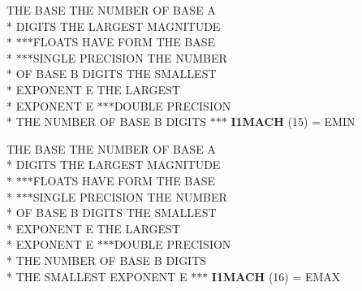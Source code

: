 \begin{DoxyCompactItemize}
\item 
\hypertarget{namespaceport_a3c34e8db5d9e994247f6ee958abcc155}{T\+H\+E B\+A\+S\+E T\+H\+E N\+U\+M\+B\+E\+R O\+F B\+A\+S\+E A \\*
D\+I\+G\+I\+T\+S T\+H\+E L\+A\+R\+G\+E\+S\+T M\+A\+G\+N\+I\+T\+U\+D\+E \\*
$\ast$$\ast$$\ast$F\+L\+O\+A\+T\+S H\+A\+V\+E F\+O\+R\+M T\+H\+E B\+A\+S\+E \\*
$\ast$$\ast$$\ast$S\+I\+N\+G\+L\+E P\+R\+E\+C\+I\+S\+I\+O\+N T\+H\+E N\+U\+M\+B\+E\+R \\*
O\+F B\+A\+S\+E B D\+I\+G\+I\+T\+S T\+H\+E S\+M\+A\+L\+L\+E\+S\+T \\*
E\+X\+P\+O\+N\+E\+N\+T E T\+H\+E L\+A\+R\+G\+E\+S\+T \\*
E\+X\+P\+O\+N\+E\+N\+T E $\ast$$\ast$$\ast$D\+O\+U\+B\+L\+E P\+R\+E\+C\+I\+S\+I\+O\+N \\*
T\+H\+E N\+U\+M\+B\+E\+R O\+F B\+A\+S\+E B D\+I\+G\+I\+T\+S $\ast$$\ast$$\ast$ {\bfseries I1\+M\+A\+C\+H} (15) = E\+M\+I\+N}\label{namespaceport_a3c34e8db5d9e994247f6ee958abcc155}

\item 
\hypertarget{namespaceport_a2fd924ccb27d83b2a80381fc65eeaf65}{T\+H\+E B\+A\+S\+E T\+H\+E N\+U\+M\+B\+E\+R O\+F B\+A\+S\+E A \\*
D\+I\+G\+I\+T\+S T\+H\+E L\+A\+R\+G\+E\+S\+T M\+A\+G\+N\+I\+T\+U\+D\+E \\*
$\ast$$\ast$$\ast$F\+L\+O\+A\+T\+S H\+A\+V\+E F\+O\+R\+M T\+H\+E B\+A\+S\+E \\*
$\ast$$\ast$$\ast$S\+I\+N\+G\+L\+E P\+R\+E\+C\+I\+S\+I\+O\+N T\+H\+E N\+U\+M\+B\+E\+R \\*
O\+F B\+A\+S\+E B D\+I\+G\+I\+T\+S T\+H\+E S\+M\+A\+L\+L\+E\+S\+T \\*
E\+X\+P\+O\+N\+E\+N\+T E T\+H\+E L\+A\+R\+G\+E\+S\+T \\*
E\+X\+P\+O\+N\+E\+N\+T E $\ast$$\ast$$\ast$D\+O\+U\+B\+L\+E P\+R\+E\+C\+I\+S\+I\+O\+N \\*
T\+H\+E N\+U\+M\+B\+E\+R O\+F B\+A\+S\+E B D\+I\+G\+I\+T\+S \\*
T\+H\+E S\+M\+A\+L\+L\+E\+S\+T E\+X\+P\+O\+N\+E\+N\+T E $\ast$$\ast$$\ast$ {\bfseries I1\+M\+A\+C\+H} (16) = E\+M\+A\+X}\label{namespaceport_a2fd924ccb27d83b2a80381fc65eeaf65}


\end{DoxyCompactItemize}
